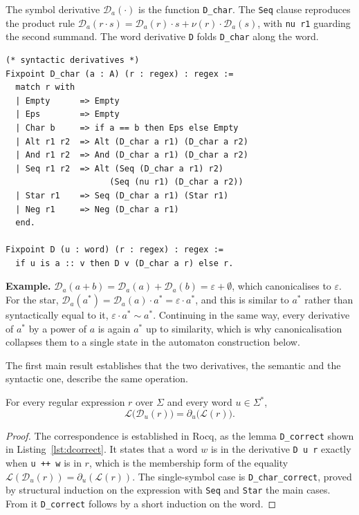 The symbol derivative $\mathcal{D}_a(\cdot)$
is the function \texttt{D\_char}. The \texttt{Seq} clause reproduces
the product rule
$\mathcal{D}_a(r\cdot s)=\mathcal{D}_a(r)\cdot s + \nu(r)\cdot\mathcal{D}_a(s)$, with
\texttt{nu r1} guarding the second summand. The word derivative \texttt{D} folds
\texttt{D\_char} along the word.

\begin{lstlisting}[style=rocqstyle,caption={Syntactic derivatives (\texttt{Derivatives.v}).},label={lst:dchar}]
(* syntactic derivatives *)
Fixpoint D_char (a : A) (r : regex) : regex :=
  match r with
  | Empty      => Empty
  | Eps        => Empty
  | Char b     => if a == b then Eps else Empty
  | Alt r1 r2  => Alt (D_char a r1) (D_char a r2)
  | And r1 r2  => And (D_char a r1) (D_char a r2)
  | Seq r1 r2  => Alt (Seq (D_char a r1) r2)
                     (Seq (nu r1) (D_char a r2))
  | Star r1    => Seq (D_char a r1) (Star r1)
  | Neg r1     => Neg (D_char a r1)
  end.

Fixpoint D (u : word) (r : regex) : regex :=
  if u is a :: v then D v (D_char a r) else r.
\end{lstlisting}

\noindent\textbf{Example.}
$\mathcal{D}_a(a+b)=\mathcal{D}_a(a)+\mathcal{D}_a(b)=\varepsilon+\emptyset$, which
canonicalises to $\varepsilon$. For the star,
$\mathcal{D}_a(a^{*})=\mathcal{D}_a(a)\cdot a^{*}=\varepsilon\cdot a^{*}$, and this is
similar to $a^{*}$ rather than syntactically equal to it,
$\varepsilon\cdot a^{*}\sim a^{*}$. Continuing in the same way, every derivative of
$a^{*}$ by a power of $a$ is again $a^{*}$ up to similarity, which is why
canonicalisation collapses them to a single state in the automaton construction
below.

\medskip
The first main result establishes that the two derivatives, the semantic and the
syntactic one, describe the same operation.

\begin{theorem}\label{the:two-derivative-mapping}
For every regular expression $r$ over $\Sigma$ and every word $u\in\Sigma^{*}$,
\[
  \mathcal{L}\bigl(\mathcal{D}_{u}(r)\bigr)=\partial_{u}\bigl(\mathcal{L}(r)\bigr).
\]
\end{theorem}

\begin{proof}
The correspondence is established in Rocq, as the lemma
\texttt{D\_correct} shown in Listing~\ref{lst:dcorrect}. It states that a word $w$
is in the derivative \texttt{D u r} exactly when \texttt{u ++ w} is in $r$,
which is the membership form of the equality
$\mathcal{L}(\mathcal{D}_u(r))=\partial_u(\mathcal{L}(r))$. The single-symbol case
is \texttt{D\_char\_correct}, proved by structural induction on the expression with
\texttt{Seq} and \texttt{Star} the main cases. From it \texttt{D\_correct}
follows by a short induction on the word.
\end{proof}

